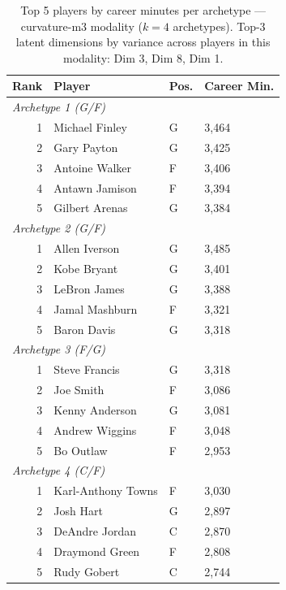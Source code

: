 \begin{table}[htbp]
  \centering\small
  \begin{tabular}{rlll}
    \toprule
    Rank & Player & Pos. & Career Min. \\
    \midrule
    \multicolumn{4}{l}{\textit{Archetype 1 (G/F)}} \\
    \midrule
    1 & Michael Finley & G & 3,464 \\
    2 & Gary Payton & G & 3,425 \\
    3 & Antoine Walker & F & 3,406 \\
    4 & Antawn Jamison & F & 3,394 \\
    5 & Gilbert Arenas & G & 3,384 \\
    \midrule[0.4pt]
    \multicolumn{4}{l}{\textit{Archetype 2 (G/F)}} \\
    \midrule
    1 & Allen Iverson & G & 3,485 \\
    2 & Kobe Bryant & G & 3,401 \\
    3 & LeBron James & G & 3,388 \\
    4 & Jamal Mashburn & F & 3,321 \\
    5 & Baron Davis & G & 3,318 \\
    \midrule[0.4pt]
    \multicolumn{4}{l}{\textit{Archetype 3 (F/G)}} \\
    \midrule
    1 & Steve Francis & G & 3,318 \\
    2 & Joe Smith & F & 3,086 \\
    3 & Kenny Anderson & G & 3,081 \\
    4 & Andrew Wiggins & F & 3,048 \\
    5 & Bo Outlaw & F & 2,953 \\
    \midrule[0.4pt]
    \multicolumn{4}{l}{\textit{Archetype 4 (C/F)}} \\
    \midrule
    1 & Karl-Anthony Towns & F & 3,030 \\
    2 & Josh Hart & G & 2,897 \\
    3 & DeAndre Jordan & C & 2,870 \\
    4 & Draymond Green & F & 2,808 \\
    5 & Rudy Gobert & C & 2,744 \\
    \bottomrule
  \end{tabular}
  \caption{Top 5 players by career minutes per archetype --- curvature-m3 modality ($k=4$ archetypes). Top-3 latent dimensions by variance across players in this modality: Dim 3, Dim 8, Dim 1.}
  \label{tab:arch_reps_curvature_m3}
\end{table}

